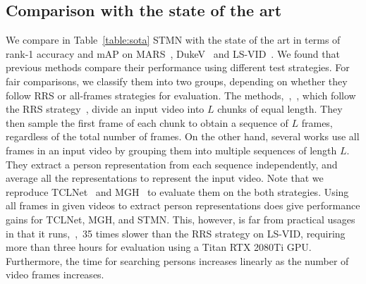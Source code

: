 \documentclass[10pt,twocolumn,letterpaper]{article}
\begin{document}
			
	
		
		
	\subsection{Comparison with the state of the art} \label{subsec:comp_w_sota}
	\vspace{-0.1cm}
	
		We compare in Table~\ref{table:sota} STMN with the state of the art in terms of rank-1 accuracy and mAP on MARS~\cite{zheng2016mars}, DukeV~\cite{wu2018exploit} and LS-VID~\cite{li2019global}. We found that previous methods compare their performance using different test strategies. For fair comparisons, we classify them into two groups, depending on whether they follow RRS or all-frames strategies for evaluation. The methods,~\eg,~\cite{li2018diversity,liu2019spatially}, which follow the RRS strategy~\cite{li2018diversity}, divide an input video into $L$ chunks of equal length. They then sample the first frame of each chunk to obtain a sequence of $L$ frames, regardless of the total number of frames. On the other hand, several works use all frames in an input video by grouping them into multiple sequences of length $L$. They extract a person representation from each sequence independently, and average all the representations to represent the input video. Note that we reproduce TCLNet~\cite{hou2020temporal} and  MGH~\cite{yan2020learning} to evaluate them on the both strategies. Using all frames in given videos to extract person representations does give performance gains for TCLNet, MGH, and STMN. This, however, is far from practical usages in that it runs,~\eg,~35 times slower than the RRS strategy on LS-VID, requiring more than three hours for evaluation using a Titan RTX 2080Ti GPU. Furthermore, the time for searching persons increases linearly as the number of video frames increases.
		
\end{document}
